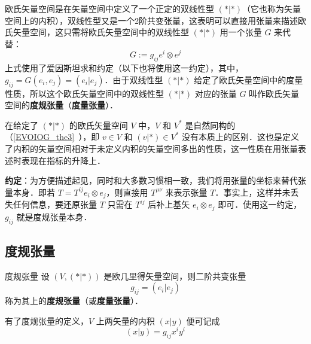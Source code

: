 
欧氏矢量空间是在矢量空间中定义了一个正定的双线性型 $(*|*)$（它也称为矢量空间上的内积），双线性型又是一个2阶共变张量，这表明可以直接用张量来描述欧氏矢量空间，这只需将欧氏矢量空间中的双线性型 $(*|*)$ 用一个张量 $G$ 来代替：
\begin{equation}
G:=g_{ij} e^i\otimes e^j
\end{equation}
上式使用了爱因斯坦求和约定（以下也将使用这一约定），其中，$g_{ij}=G(e_i,e_j)=(e_i|e_j)$．由于双线性型 $(*|*)$ 给定了欧氏矢量空间中的度量性质，所以这个欧氏矢量空间中的双线性型 $(*|*)$ 对应的张量 $G$ 叫作欧氏矢量空间的\textbf{度规张量}（\textbf{度量张量}）．

在给定了 $(*|*)$ 的欧氏矢量空间 $V$ 中，$V$ 和 $V^*$ 是自然同构的（\autoref{EVOIOG_the3}~），即 $v\in V $ 和 $(v|*)\in V^*$ 没有本质上的区别．这也是定义了内积的矢量空间相对于未定义内积的矢量空间多出的性质，这一性质在用张量表述时表现在指标的升降上．

\textbf{约定}：为方便描述起见，同时和大多数习惯相一致，我们将用张量的坐标来替代张量本身．即若 $T=T^{ij} e_{i}\otimes e_{j}$，则直接用 $T^{\mu\nu}$ 来表示张量 $T$．事实上，这样并未丢失任何信息，要还原张量 $T$ 只需在 $T^{ij}$ 后补上基矢 $e_{i}\otimes e_{j}$ 即可．使用这一约定，$g_{ij}$ 就是度规张量本身．
\subsection{度规张量}
\begin{definition}{度规张量}
设 $(V,(*|*))$ 是欧几里得矢量空间，则二阶共变张量
\begin{equation}
g_{ij}=(e_i|e_j)
\end{equation}
称为其上的\textbf{度规张量}（或\textbf{度量张量}）．
\end{definition}
有了度规张量的定义，$V$ 上两矢量的内积 $(x|y)$ 便可记成
\begin{equation}
(x|y)=g_{ij}x^i y^i
\end{equation}

